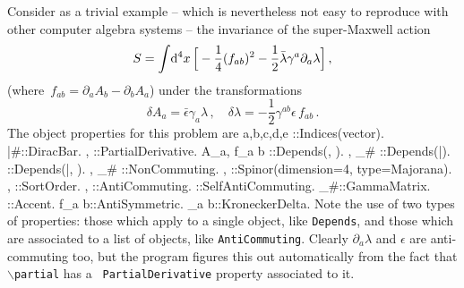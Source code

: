 \documentclass{elsart}
\newenvironment{screen}{\vspace{1ex}\Verbatim}{\endVerbatim\vspace{1ex}}
\begin{document}
Consider as a trivial example -- which is nevertheless not easy to
reproduce with other computer algebra systems -- the invariance of the
super-Maxwell action
\begin{equation}
S = \int\!{\rm d^4}x\, \Big[ -\frac{1}{4} (f_{ab})^2 -
\frac{1}{2}\bar{\lambda}\gamma^a \partial_a \lambda\Big]\,,
\end{equation}
(where~$f_{ab} = \partial_a A_b - \partial_b A_a$) under the
transformations
\begin{equation}
\delta A_a = \bar{\epsilon}\gamma_a \lambda\,,\quad
\delta \lambda = -\frac{1}{2} \gamma^{a b} \epsilon\, f_{a b}\,.
\end{equation}
The object properties for this problem are
\begin{screen}
{ a,b,c,d,e }::Indices(vector).
\bar{#}::DiracBar.
{ \partial{#}, \ppartial{#} }::PartialDerivative.
{ A_{a}, f_{a b} }::Depends(\partial, \ppartial).
{ \epsilon, \gamma_{#} }::Depends(\bar).
\lambda::Depends(\bar, \partial).
{ \lambda, \gamma_{#} }::NonCommuting.
{ \lambda, \epsilon }::Spinor(dimension=4, type=Majorana).
{ \epsilon, \lambda }::SortOrder.
{ \epsilon, \lambda }::AntiCommuting.
\lambda::SelfAntiCommuting.
\gamma_{#}::GammaMatrix.
\delta{#}::Accent.
f_{a b}::AntiSymmetric.
\delta_{a b}::KroneckerDelta.
\end{screen}
Note the use of two types of properties: those which apply to a single
object, like {\tt Depends}, and those which are associated to a list
of objects, like {\tt AntiCommuting}. Clearly $\partial_a \lambda$ and
$\epsilon$ are anti-commuting too, but the program figures this out
automatically from the fact that {\tt $\backslash$partial} has a {\tt
PartialDerivative} property associated to it.
\end{document}
